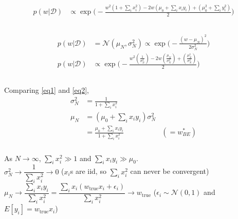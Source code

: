 \documentclass[12pt, fleqn]{article}
\begin{document}
\subsubsection{}
\begin{equation}
  \begin{aligned}
    \label{eq1}
    p(w | \mathcal{D}) & \propto \exp \bigg( -\frac{w^2 (1 + \sum_i x_i^2) - 2w(\mu_0 + \sum_i x_i y_i) + (\mu_0^2 + \sum_i y_i^2)}{2} \bigg) \\
  \end{aligned}
\end{equation}

\subsubsection{}
\begin{equation}
  \begin{aligned}
    \label{eq2}
    p(w | \mathcal{D}) & = \mathcal{N}(\mu_N, \sigma_N^2) \propto \exp \bigg( -\frac{(w - \mu_N)^2}{2 \sigma_N^2} \bigg)                                 \\
    p(w | \mathcal{D}) & \propto \exp \bigg( -\frac{w^2 (\frac{1}{\sigma_N^2}) - 2w (\frac{\mu_N}{\sigma_N^2}) + (\frac{\mu_N^2}{\sigma_N^2})}{2} \bigg) \\
  \end{aligned}
\end{equation}

\subsubsection{}
Comparing \eqref{eq1} and \eqref{eq2},
\begin{equation*}
  \begin{aligned}
    \sigma_N^2 & = \frac{1}{1 + \sum_i x_i^2}                                     \\
    \mu_N      & = (\mu_0 + \sum_i x_i y_i) \sigma_N^2                            \\
               & = \frac{\mu_0 + \sum_i x_i y_i}{1 + \sum_i x_i^2} & (= w^*_{BE})
  \end{aligned}
\end{equation*}

\subsubsection{}
As $N \to \infty$, $\sum_i x_i^2 \gg 1$ and $\sum_i x_i y_i \gg \mu_0$. \\
$\sigma_N^2 \to \dfrac{1}{\sum_i x_i^2} \to 0$ ($x_i$s are iid, so $\sum_i x_i^2$ can never be convergent)\\
$\mu_N \to \dfrac{\sum_i x_i y_i}{\sum_i x_i^2} = \dfrac{\sum_i x_i (w_{\text{true}} x_i + \epsilon_i)}{\sum_i x_i^2} \to w_{\text{true}}$ ($\epsilon_i \sim \mathcal{N}(0, 1)$ and $E[y_i] = w_{\text{true}} x_i$)
\end{document}
